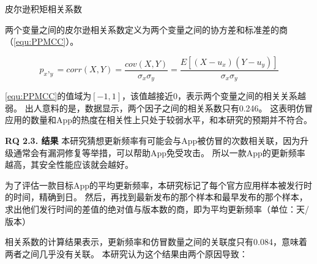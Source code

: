 \begin{Def}
    皮尔逊积矩相关系数

    两个变量之间的皮尔逊相关系数定义为两个变量之间的协方差和标准差的商（\autoref{equ:PPMCC}）。
\end{Def}
\begin{equation}
    p_x,_y = corr(X,Y)=\frac{cov(X,Y)}{\sigma_x\sigma_y}=\frac{E[(X-u_x)(Y-u_y)]}{\sigma_x\sigma_y}
    \label{equ:PPMCC}
\end{equation}
\vspace{0.5mm}

\autoref{equ:PPMCC}的值域为$[-1, 1]$，该值越接近0，表示两个变量之间的相关关系越弱。
出人意料的是，数据显示，两个因子之间的相关系数只有0.246。
这表明仿冒应用的数量和App的热度在相关性上只处于较弱水平，和本研究的预期并不符合。

{\bf RQ 2.3. 结果}
本研究猜想更新频率有可能会与App被仿冒的次数相关联，因为升级通常会有漏洞修复等举措，可以帮助App免受攻击。
所以一款App的更新频率越高，其安全性能应该就会越好。

为了评估一款目标App的平均更新频率，本研究标记了每个官方应用样本被发行时的时间，精确到日。
然后，再找到最新发布的那个样本和最早发布的那个样本，求出他们发行时间的差值的绝对值与版本数的商，即为平均更新频率（单位：天/版本）

相关系数的计算结果表示，更新频率和仿冒数量之间的关联度只有0.084，意味着两者之间几乎没有关联。
本研究认为这个结果由两个原因导致：

